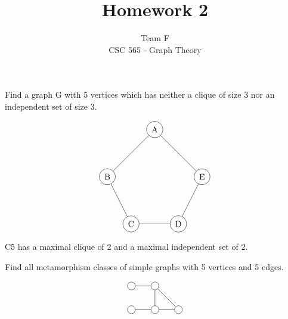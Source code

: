\documentclass[12pt]{article}
\newenvironment{question}[2][Question]{\begin{trivlist}
\item[\hskip \labelsep {\bfseries #1}\hskip \labelsep {\bfseries #2.}]}{\end{trivlist}}
\begin{document}


\title{Homework 2}%
\author{Team F\\ %
CSC 565 - Graph Theory} %

\maketitle

\begin{question}{1}
Find a graph G with 5 vertices which has neither a clique of size 3 nor an independent set of size 3.
\end{question}

\begin{align*}
\begin{tikzpicture}
    \node[shape=circle,draw=black] (C) at (1,0) {C};
    \node[shape=circle,draw=black] (B) at (0,2) {B};
    \node[shape=circle,draw=black] (A) at (2,4) {A};
    \node[shape=circle,draw=black] (D) at (3,0) {D};
    \node[shape=circle,draw=black] (E) at (4,2) {E};
    \path [] (A) edge node[left] {} (B);
    \path [] (B) edge node[left] {} (C);
    \path [] (C) edge node[left] {} (D);
    \path [] (D) edge node[left] {} (E);
    \path [] (E) edge node[left] {} (A);
\end{tikzpicture}
\end{align*}
C5 has a maximal clique of 2 and a maximal independent set of 2.


\begin{question}{2}
	Find all metamorphism classes of simple graphs with 5 vertices and 5 edges.
\end{question}


\begin{align*}
\begin{tikzpicture}
\node[shape=circle,draw=black] (A) at (0,0) {};
\node[shape=circle,draw=black] (B) at (1,0) {};
\node[shape=circle,draw=black] (C) at (0,-1) {};
\node[shape=circle,draw=black] (D) at (1,-1) {};
\node[shape=circle,draw=black] (E) at (2,-1) {};
\path [] (A) edge node[left] {} (B);
\path [] (C) edge node[left] {} (D);
\path [] (B) edge node[left] {} (D);
\path [] (B) edge node[left] {} (E);
\path [] (D) edge node[left] {} (E);
\end{tikzpicture}
\end{align*}
\end{document}
